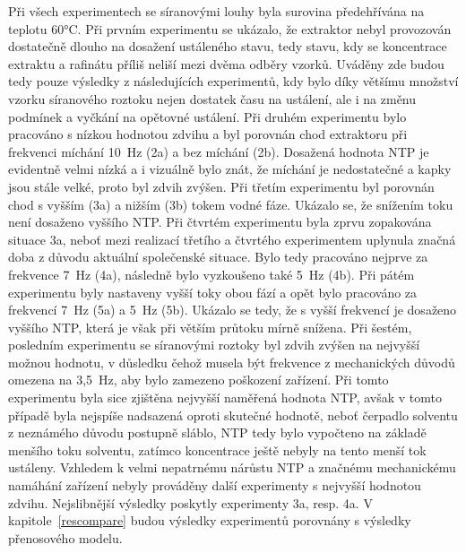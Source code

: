 Při všech experimentech se síranovými louhy byla surovina předehřívána na teplotu 60°C.
Při prvním experimentu se ukázalo, že extraktor nebyl provozován dostatečně dlouho na dosažení ustáleného stavu, tedy stavu, kdy se koncentrace extraktu a rafinátu příliš neliší mezi dvěma odběry vzorků.
Uváděny zde budou tedy pouze výsledky z následujících experimentů, kdy bylo díky většímu množství vzorku síranového roztoku nejen dostatek času na ustálení, ale i na změnu podmínek a vyčkání na opětovné ustálení.
Při druhém experimentu bylo pracováno s nízkou hodnotou zdvihu a byl porovnán chod extraktoru při frekvenci míchání 10~Hz (2a) a bez míchání (2b).
Dosažená hodnota NTP je evidentně velmi nízká a i vizuálně bylo znát, že míchání je nedostatečné a kapky jsou stále velké, proto byl zdvih zvýšen.
Při třetím experimentu byl porovnán chod s vyšším (3a) a nižším (3b) tokem vodné fáze.
Ukázalo se, že snížením toku není dosaženo vyššího NTP.
Při čtvrtém experimentu byla zprvu zopakována situace 3a, neboť mezi realizací třetího a čtvrtého experimentem uplynula značná doba z důvodu aktuální společenské situace.
Bylo tedy pracováno nejprve za frekvence 7~Hz (4a), následně bylo vyzkoušeno také 5~Hz (4b).
Při pátém experimentu byly nastaveny vyšší toky obou fází a opět bylo pracováno za frekvencí 7~Hz (5a) a 5~Hz (5b).
Ukázalo se tedy, že s vyšší frekvencí je dosaženo vyššího NTP, která je však při větším průtoku mírně snížena.
Při šestém, posledním experimentu se síranovými roztoky byl zdvih zvýšen na nejvyšší možnou hodnotu, v důsledku čehož musela být frekvence z mechanických důvodů omezena na 3,5~Hz, aby bylo zamezeno poškození zařízení.
Při tomto experimentu byla sice zjištěna nejvyšší naměřená hodnota NTP, avšak v tomto případě byla nejspíše nadsazená oproti skutečné hodnotě, neboť čerpadlo solventu z neznámého důvodu postupně sláblo, NTP tedy bylo vypočteno na základě menšího toku solventu, zatímco koncentrace ještě nebyly na tento menší tok ustáleny.
Vzhledem k velmi nepatrnému nárůstu NTP a značnému mechanickému namáhání zařízení nebyly prováděny další experimenty s nejvyšší hodnotou zdvihu.
Nejslibnější výsledky poskytly experimenty 3a, resp. 4a.
V kapitole~\ref{rescompare} budou výsledky experimentů porovnány s výsledky přenosového modelu.

